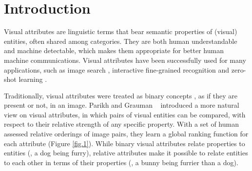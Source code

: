 

\section{Introduction}

 



Visual attributes are linguistic terms that bear semantic properties of (visual) entities, often shared among categories. They are both human understandable and machine detectable, which makes them appropriate for better human machine communications. Visual attributes have been successfully used for many applications, such as image search \cite{whittlesearch}, interactive fine-grained recognition \cite{branson13, branson10} and zero-shot learning \cite{6571196, parikh2011}.

Traditionally, visual attributes were treated as binary concepts \cite{ferrari2007learning, Farhadi09describingobjects}, as if they are present or not, in an image.
Parikh and Grauman ~\cite{parikh2011} introduced a more natural view on visual attributes, in which pairs of visual entities can be compared, with respect to their relative strength of any specific property. With a set of human assessed relative orderings of image pairs, they learn a global ranking function for each attribute (Figure \ref{fig.1}).
While binary visual attributes relate properties to entities (\eg, a dog being furry), relative attributes make it possible to relate entities to each other in terms of their properties (\eg, a bunny being furrier than a dog).

